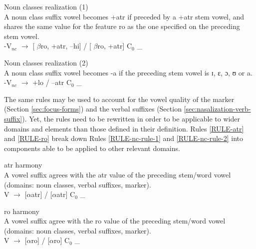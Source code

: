 \begin{Rule}\label{RULE-nc-rule-1}{\rm Noun classes realization (1)}\\
A noun class suffix vowel becomes {\sc +atr} if preceded by a {\sc +atr}
stem vowel, and shares the same value for the
feature {\sc ro}  as the one specified on the preceding stem vowel. \\
-V$_{nc}$  $\rightarrow$ [ $\beta${\sc ro},  {\sc +atr},  {\sc --hi}] 
 / [ 
$\beta${\sc ro},
{\sc +atr}] C$_0$ \_

\end{Rule}


\begin{Rule}\label{RULE-nc-rule-2}{\rm Noun classes realization (2)}\\
A noun class suffix vowel becomes {\sls -a} if the preceding stem vowel is 
{ɪ},
{ɛ}, {ɔ}, {ʊ} or {a}.\\
-V$_{nc}$ $\rightarrow$ {\sc +lo}  / {\sc --atr} C$_0$ \_ 
\end{Rule}


The same rules may be used to account for the vowel
quality of the  marker (Section \ref{sec:focus-forms}) and  the verbal
suffixes (Section \ref{sec:nasalization-verb-suffix}). Yet, the rules need to be rewritten in order to be  applicable to wider domains and elements than those defined in their definition. Rules \ref{RULE-atr} and \ref{RULE-ro} break down Rules \ref{RULE-nc-rule-1} and \ref{RULE-nc-rule-2} into components able to be applied to other relevant domains.



\begin{Rule}\label{RULE-atr}{{\sc atr} harmony}\\
A vowel suffix agrees with the {\sc atr} value of   the preceding stem/word 
vowel (domains: noun classes, verbal suffixes,  marker).\\
V $\rightarrow$ $[\alpha${\sc atr}$]$  / $[\alpha${\sc atr}$]$ C$_0$ \_
\end{Rule}


\begin{Rule}\label{RULE-ro}{{\sc ro} harmony}\\
A vowel suffix  agree with the {\sc ro} value of  the   preceding stem/word
 vowel (domains: noun classes, verbal suffixes,  marker).\\
V $\rightarrow$ [$\alpha${\sc ro}]  / [$\alpha${\sc ro}] C$_0$ \_
\end{Rule}

